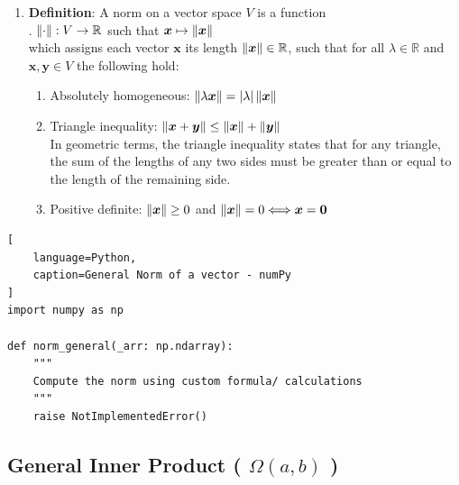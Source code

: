 \begin{enumerate}
    \item \textbf{Definition}: A norm on a vector space $V$ is a function
    \hfill \cite{mfml/book/mml/Deisenroth-Faisal-Ong}
    \\
    .\hfill
    $\left\| \cdot \right\|: V \to \mathbb{R}$ such that $\bm{x} \mapsto \left\| \bm{x} \right\|$
    \hfill \cite{mfml/book/mml/Deisenroth-Faisal-Ong}
    \\
    which assigns each vector $\bm{x}$ its length $\left\| \bm{x} \right\| \in \mathbb{R}$, such that for all $\lambda \in \mathbb{R}$ and $\bm{x}, \bm{y} \in V$ the following hold:
    \hfill \cite{mfml/book/mml/Deisenroth-Faisal-Ong}
    \begin{enumerate}
        \item Absolutely homogeneous: $\left\| \lambda \bm{x} \right\| = \left| \lambda \right| \left\| \bm{x} \right\|$
        \hfill \cite{mfml/book/mml/Deisenroth-Faisal-Ong}

        \item Triangle inequality: $\left\| \bm{x} + \bm{y} \right\| \leq \left\| \bm{x} \right\| + \left\| \bm{y} \right\|$
        \hfill \cite{mfml/book/mml/Deisenroth-Faisal-Ong}
        \\
        In geometric terms, the triangle inequality states that for any triangle, the sum of the lengths of any two sides must be greater than or equal to the length of the remaining side.
        

        \item Positive definite: $\left\| \bm{x} \right\| \geq 0$ and $\left\| \bm{x} \right\| = 0 \Longleftrightarrow \bm{x} = \bm{0}$
        \hfill \cite{mfml/book/mml/Deisenroth-Faisal-Ong}
    \end{enumerate}
\end{enumerate}




\begin{lstlisting}[
    language=Python,
    caption=General Norm of a vector - numPy
]
import numpy as np

def norm_general(_arr: np.ndarray):
    """
    Compute the norm using custom formula/ calculations
    """
    raise NotImplementedError()
\end{lstlisting}






\subsection{General Inner Product ( $\Omega(a, b)$ )}

